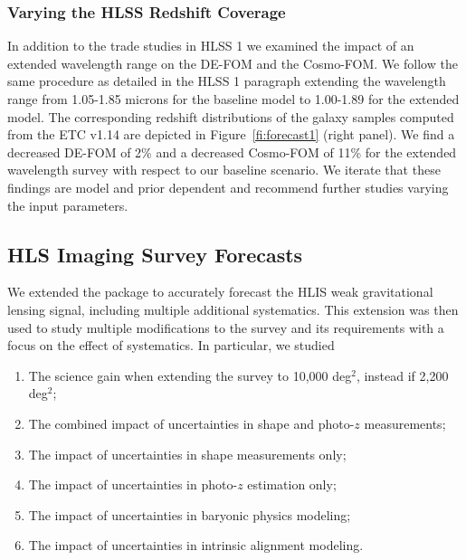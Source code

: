 
\subsubsection{Varying the HLSS Redshift Coverage} In addition to the trade studies in HLSS 1 we examined the impact of an extended wavelength range on the DE-FOM and the Cosmo-FOM. We follow the same procedure as detailed in the HLSS 1 paragraph extending the wavelength range from 1.05-1.85 microns for the baseline model to 1.00-1.89 for the extended model. The corresponding redshift distributions of the galaxy samples computed from the ETC v1.14 are depicted in  Figure~\ref{fi:forecast1} (right panel). We find a decreased DE-FOM of 2\% and a decreased Cosmo-FOM of 11\% for the extended wavelength survey with respect to our baseline scenario. We iterate that these findings are model and prior dependent and recommend further studies varying the input parameters.

\subsection{HLS Imaging Survey Forecasts}
\label{sec:HLISforecasts}

\begin{summaryii}
We extended the \CoLi package to accurately forecast the HLIS weak gravitational lensing signal, including multiple additional systematics. This extension was then used to study multiple modifications to the survey and its requirements with a focus on the effect of systematics. In particular, we studied
\begin{enumerate}
  \item The science gain when extending the survey to 10,000 deg$^2$, instead if 2,200 deg$^2$;
  \item The combined impact of uncertainties in shape and photo-$z$ measurements;
  \item The impact of uncertainties in shape measurements only;
  \item The impact of uncertainties in photo-$z$ estimation only;
  \item The impact of uncertainties in baryonic physics modeling;
  \item The impact of uncertainties in intrinsic alignment modeling.
\end{enumerate}
\end{summaryii}

